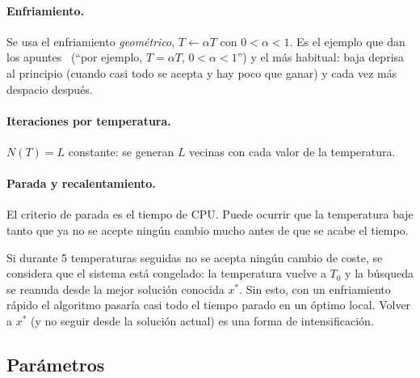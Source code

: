 
\paragraph{Enfriamiento.} Se usa el enfriamiento \emph{geométrico}, $T\leftarrow\alpha T$ con
$0<\alpha<1$. Es el ejemplo que dan los apuntes~\cite{yanez} (``por ejemplo, $T=\alpha T$,
$0<\alpha<1$'') y el más habitual: baja deprisa al principio (cuando casi todo se acepta y
hay poco que ganar) y cada vez más despacio después.

\paragraph{Iteraciones por temperatura.} $N(T)=L$ constante: se generan $L$ vecinas con cada
valor de la temperatura.

\paragraph{Parada y recalentamiento.} El criterio de parada es el tiempo de CPU. Puede
ocurrir que la temperatura baje tanto que ya no se acepte ningún cambio mucho antes de que se
acabe el tiempo.

\begin{decision}
Si durante 5 temperaturas seguidas no se acepta ningún cambio de coste, se considera que el
sistema está congelado: la temperatura vuelve a $T_0$ y la búsqueda se reanuda desde la mejor
solución conocida $x^\ast$. Sin esto, con un enfriamiento rápido el algoritmo pasaría casi
todo el tiempo parado en un óptimo local. Volver a $x^\ast$ (y no seguir desde la solución
actual) es una forma de intensificación.
\end{decision}

\subsection{Parámetros}

